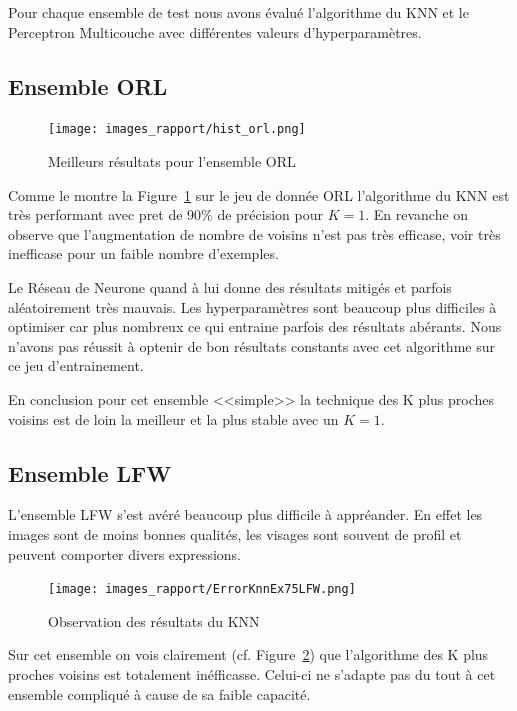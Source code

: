 \documentclass[a4paper,10pt,twocolumn]{extarticle}
\begin{document}
Pour chaque ensemble de test nous avons évalué l'algorithme du KNN et le Perceptron Multicouche avec différentes valeurs d'hyperparamètres.

\subsection{Ensemble ORL}
\begin{figure}[H]
  \begin{center}
    \texttt{[image: images\_rapport/hist\_orl.png]}
    \caption{Meilleurs résultats pour l'ensemble ORL}
    \label{fig:results_orl}
  \end{center}
\end{figure}
Comme le montre la Figure~\ref{fig:results_orl} sur le jeu de donnée ORL l'algorithme du KNN est très performant avec pret de 90\% de précision pour $K = 1$. En revanche on observe que l'augmentation de nombre de voisins n'est pas très efficase, voir très inefficase pour un faible nombre d'exemples.

Le Réseau de Neurone quand à lui donne des résultats mitigés et parfois aléatoirement très mauvais. Les hyperparamètres sont beaucoup plus difficiles à optimiser car plus nombreux ce qui entraine parfois des résultats abérants. Nous n'avons pas réussit à optenir de bon résultats constants avec cet algorithme sur ce jeu d'entrainement.

En conclusion pour cet ensemble <<simple>> la technique des K plus proches voisins est de loin la meilleur et la plus stable avec un $K = 1$.

\subsection{Ensemble LFW}
L'ensemble LFW s'est avéré beaucoup plus difficile à appréander. En effet les images sont de moins bonnes qualités, les visages sont souvent de profil et peuvent comporter divers expressions.
\begin{figure}[H]
  \begin{center}
    \texttt{[image: images\_rapport/ErrorKnnEx75LFW.png]}
    \caption{Observation des résultats du KNN}
    \label{fig:knn_lfw}
  \end{center}
\end{figure}
Sur cet ensemble on vois clairement (cf. Figure~\ref{fig:knn_lfw}) que l'algorithme des K plus proches voisins est totalement inéfficasse. Celui-ci ne s'adapte pas du tout à cet ensemble compliqué à cause de sa faible capacité.
\end{document}
